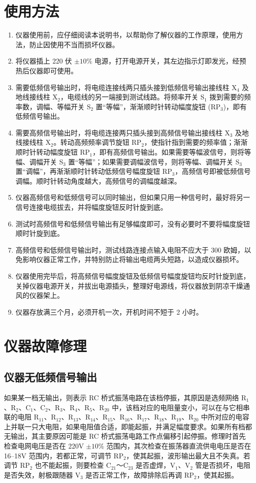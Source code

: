 \documentclass[12pt,UTF8]{ctexbook}
\begin{document}
	\section{使用方法}
	\begin{enumerate}
		\item 仪器使用前，应仔细阅读本说明书，以帮助你了解仪器的工作原理，使用方法，防止因使用不当而损坏仪器。
		\item 将仪器插上 220 伏 \(\pm 10\%\) 电源，打开电源开关，其左边指示灯即发光，经预热后仪器即可使用。
		\item 需要低频信号输出时，将电缆连接线两只插头接到低频信号输出接线柱 X\(_4\) 及地线接线柱 X\(_2\)，电缆线的另一端接到测试线路。将频率开关 S\(_1\) 拨到需要的频率数，调幅、等幅开关 S\(_2\) 置“等幅”，渐渐顺时针转动幅度旋钮 (RP\(_3\))，即有低频信号输出。
		\item 需要高频信号输出时，将电缆连接两只插头接到高频信号输出接线柱 X\(_3\) 及地线接线柱 X\(_2\)。转动高频频率调节旋钮 RP\(_2\)，使指针指到需要的频率值；渐渐顺时针转动幅度旋钮 RP\(_1\)，即有高频信号输出。如果需要等幅波信号，则将等幅、调幅开关 S\(_3\) 置“等幅”；如果需要调幅波信号，则将等幅、调幅开关 S\(_3\) 置“调幅”，再渐渐顺时针转动低频信号幅度旋钮 RP\(_3\)，高频信号即被低频信号调幅。顺时针转动角度越大，高频信号的调幅度越深。
		\item 仪器高频信号和低频信号可以同时输出，但如果只用一种信号时，最好将另一信号连接电缆拔去，并将幅度旋钮反时针旋到底。
		\item 测试时高频信号和低频信号输出有足够幅度即可，没有必要时不要将幅度旋钮顺时针旋到底。
		\item 高频信号和低频信号输出时，测试线路连接点输入电阻不应大于 300 欧姆，以免影响仪器正常工作，并特别防止将输出电缆两头短路，以造成仪器损坏。
		\item 仪器使用完毕后，将高频信号幅度旋钮及低频信号幅度旋钮均反时针旋到底，关掉仪器电源开关，并拔出电源插头，整理好电源线，将仪器放到阴凉干燥通风的仪器架上。
		\item 仪器存放满三个月，必须开机一次，开机时间不短于 2 小时。
	\end{enumerate}
	
	\section{仪器故障修理}
	\subsection{仪器无低频信号输出}
	如果某一档无输出，则表示 RC 桥式振荡电路在该档停振，其原因是选频网络 R\(_1\)、R\(_2\)、C\(_1\)、C\(_2\)、R\(_3\)、R\(_4\)、R\(_5\)、R\(_{20}\) 中，该档对应的电阻量变小，可以在与它相串联的电阻 R\(_{11}\)、R\(_{12}\)、R\(_{13}\)、R\(_{14}\)、R\(_{15}\)、R\(_{16}\)、R\(_{17}\)、R\(_{18}\)、R\(_{19}\)、R\(_{20}\) 中所对应的电容上并联一只大电阻，如果电阻值合适，即能起振，并满足幅度要求。如果所有档都无输出，其主要原因可能是 RC 桥式振荡电路工作点偏移引起停振。修理时首先检查电网电压是否在 220V \(\pm 10\%\) 范围内，其次检查在振荡器直流供电电压是否在 16--18V 范围内，若都正常，可调节 RP\(_2\)，使其起振，波形输出最大且不失真。若调节 RP\(_2\) 也不能起振，则要检查 C\(_{21}\)～C\(_{23}\) 是否虚焊，V\(_1\)、V\(_2\) 管是否损坏，电阻是否失效，射极跟随器 V\(_3\) 是否正常工作，故障排除后再调 RP\(_2\)，使其起振。
	
\end{document}
